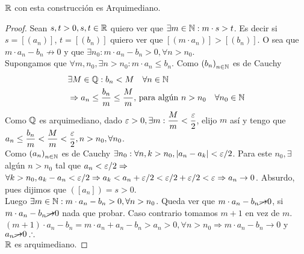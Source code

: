 \begin{theorem}
	\(\mathbb{R} \) con esta construcción es Arquimediano.
	\begin{proof}
		Sean \(s, t > 0, s, t \in \mathbb{R} \) quiero ver que \(\exists m \in \mathbb{N} : m \cdot s > t \).
		Es decir si \(s = [(a_n)]\), \(t = [(b_n)]\) quiero ver que \([(m \cdot a_n)] > [(b_n)]\). O sea que \(m \cdot a_n - b_n \not \to 0\) y que \(\exists n_0 : m \cdot a_n - b_n > 0, \forall n> n_0\). \\
		Supongamos que \(\forall m, n_0, \exists n>n_0 : m \cdot a_n \leq b_n\).
		Como \({(b_n)}_{n \in \mathbb{N}} \) es de Cauchy\begin{align*}
			 & \exists M \in \mathbb{Q} : b_n < M \quad \forall n \in \mathbb{N}                                                          \\
			 & \Rightarrow a_n \leq \dfrac{b_n}{m} \leq \dfrac{M}{m}\text{, para algún } n > n_0 \quad \forall n_0 \in \mathbb{N}
		\end{align*}
		Como \(\mathbb{Q} \) es arquimediano, dado \(\varepsilon > 0, \exists m : \dfrac{M}{m} < \dfrac{\varepsilon}{2} \), elijo \(m\) así y tengo que \(a_n \leq \dfrac{b_n}{m} < \dfrac{M}{m} < \dfrac{\varepsilon}{2}, n > n_0, \forall n_0\). \\
		Como \({(a_n)}_{n \in \mathbb{N}} \) es de Cauchy \(\exists n_0 : \forall n,k > n_0, |a_n - a_k| < \varepsilon/2\). Para este \(n_0, \exists \) algún \(n > n_0\) tal que \(a_n < \varepsilon / 2 \Rightarrow \) \\
		\(\forall k > n_0, a_k - a_n < \varepsilon / 2 \Rightarrow a_k < a_n + \varepsilon / 2 < \varepsilon / 2 + \varepsilon / 2 < \varepsilon \Rightarrow a_n \to 0\). Absurdo, pues dijimos que \(([a_n]) = s > 0\). \\
		Luego \(\exists m \in \mathbb{N} : m \cdot a_n - b_n > 0, \forall n > n_0\). Queda ver que \(m \cdot a_n - b_n \cancel{\to} 0\), si \(m \cdot a_n - b_n \cancel{\to} 0\) nada que probar. Caso contrario tomamos \(m+1\) en vez de \(m\). \\
		\((m+1) \cdot a_n - b_n = m \cdot a_n + a_n - b_n > a_n > 0, \forall n > n_0 \Rightarrow m \cdot a_n - b_n \to 0\) y \(a_n \cancel{\to} 0 \therefore \) \\
		\(\mathbb{R} \) es arquimediano.
	\end{proof}
\end{theorem}

